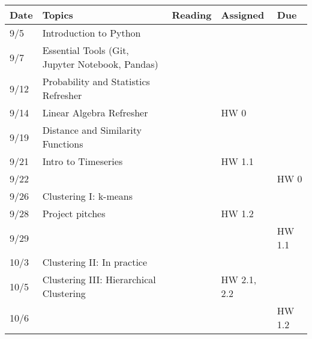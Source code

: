 \documentclass[11pt]{article}
\begin{document}
\small
\begin{centering}
\begin{tabular}{||l|p{3in}|l|l|l||}
\hline\hline
Date & Topics  & Reading & Assigned & Due  \\
\hline\hline
9/5 & Introduction to Python &  &  & \\
9/7 & Essential Tools (Git, Jupyter Notebook, Pandas) & & & \\
\hline

9/12 & Probability and Statistics Refresher & &  & \\
9/14 & Linear Algebra Refresher & & HW 0 & \\
\hline

 9/19 & Distance and Similarity Functions & &  & \\
9/21 & Intro to Timeseries & & HW 1.1& \\ 
9/22 & & & &  HW 0\\
\hline

9/26 & Clustering I: k-means & & & \\
9/28 & Project pitches & &HW 1.2  & \\ 
9/29 &&&& HW 1.1 \\
\hline

10/3 & Clustering II: In practice & & & \\  
10/5 & Clustering III: Hierarchical Clustering & & HW 2.1, 2.2 & \\ 
10/6 &&&& HW 1.2 \\
\hline


\end{tabular}
\end{centering}
\end{document}
